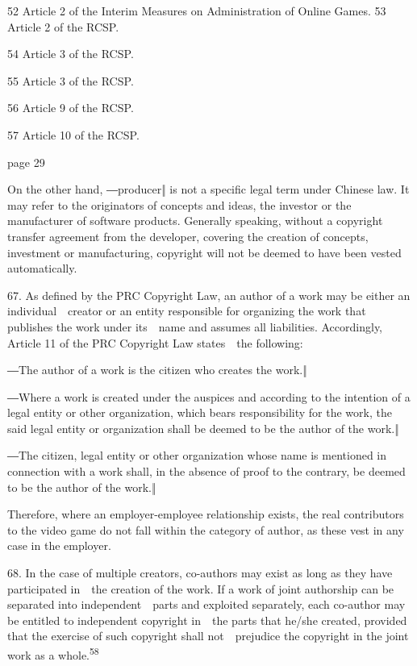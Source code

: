 \documentclass[
]{article}
\begin{document}
{52 }{Article 2 of the }{Interim Measures on Administration of Online
Games}{. }{53 }{Article 2 of the }{RCSP}{.}

{54 }{Article 3 of the }{RCSP}{.}

{55 }{Article 3 of the }{RCSP}{.}

{56 }{Article 9 of the }{RCSP}{.}

{57 }{Article 10 of the }{RCSP}{.}

{page 29}

{On the othe}{r hand, ―}{producer}{‖ is not a specific legal term under
Chinese law}{. It may refer to the originators of concepts and ideas,
the investor or the manufacturer of software products. Generally
speaking, without a copyright transfer agreement from the developer,
covering the creation of concepts, investment or manufacturing,
copyright will not be deemed to have been vested automatically.}

{67. }{As defined by the PRC }{Copyright Law}{, an author of a work may
be either an individual~~creator or an entity responsible for organizing
the work that publishes the work under its~~name and assumes all
liabilities. Accordingly, Article 11 of the PRC }{Copyright Law
}{states~~the following:}

{―The author of a work is the citizen who creates the work.‖}

{―Where a work is created u}{nder the auspices and according to the
intention of a legal entity or other organization, which bears
responsibility for the work, the said legal entity or organization shall
be deemed to be }{the author of the work.‖}

{―The citizen, legal entity or other or}{ganization whose name is
mentioned in connection with a work shall, in the absence of proof to
the contrary, be }{deemed to be the author of the work.‖}

{Therefore, where an employer-employee relationship exists, the real
contributors to the video game do not fall within the category of
author, as these vest in any case in the employer.}

{68. }{In the case of multiple creators, co-authors may exist as long as
they have participated in~~the creation of the work. If a work of joint
authorship can be separated into independent~~parts and exploited
separately, each co-author may be entitled to independent copyright
in~~the parts that he/she created, provided that the exercise of such
copyright shall not~~prejudice the copyright in the joint work as a
whole.}\textsuperscript{{58}}
\end{document}
